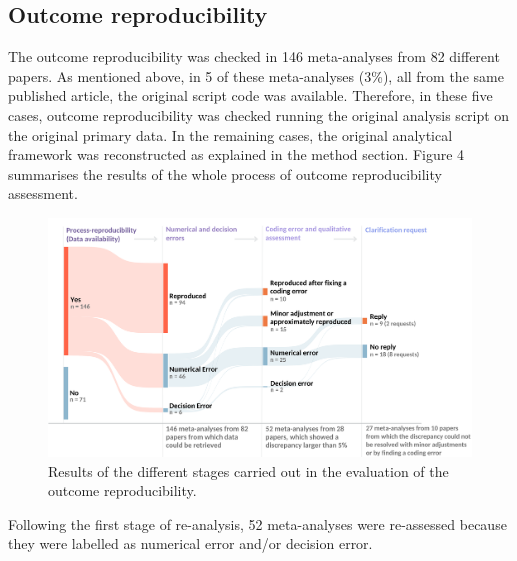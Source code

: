 \documentclass[
  ,man,floatsintext]{apa6}
\begin{document}
\hypertarget{outcome-reproducibility}{%
\subsection{Outcome reproducibility}\label{outcome-reproducibility}}

The outcome reproducibility was checked in 146 meta-analyses from 82 different papers. As mentioned above, in 5 of these meta-analyses (3\%), all from the same published article, the original script code was available. Therefore, in these five cases, outcome reproducibility was checked running the original analysis script on the original primary data. In the remaining cases, the original analytical framework was reconstructed as explained in the method section.
Figure 4 summarises the results of the whole process of outcome reproducibility assessment.

\begin{figure}
\begin{center}
\includegraphics[width=\textwidth]{results/Figure 4.png}

\caption{Results of the different stages carried out in the evaluation of the outcome reproducibility. 
}

\label{fig:fig4}
\end{center}
\end{figure}

Following the first stage of re-analysis, 52 meta-analyses were re-assessed because they were labelled as numerical error and/or decision error.
\end{document}
